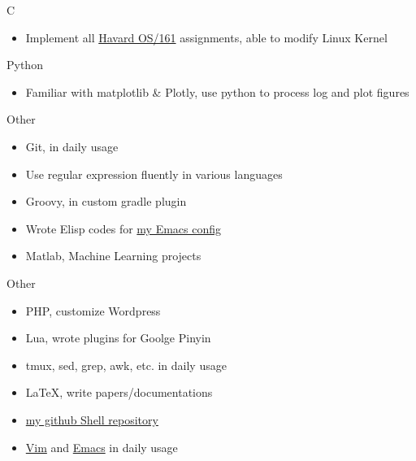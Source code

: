 \cvcomputer
{C}{
\begin{itemize}
  \item Implement all \href{http://www.eecs.harvard.edu/~syrah/os161/}{Havard OS/161} assignments,
  able to modify Linux Kernel
\end{itemize}
}
{Python}{
\begin{itemize}
  \item Familiar with matplotlib \& Plotly, use python to process log and plot figures
\end{itemize}
}

\cvcomputer
{Other}{
\begin{itemize}
  \item Git, in daily usage
  \item Use regular expression fluently in various languages
  \item Groovy, in custom gradle plugin
  \item Wrote Elisp codes for \href{https://github.com/xcv58/Emacs_config}{my Emacs config}
  \item Matlab, Machine Learning projects
\end{itemize}
}
{Other}{
\begin{itemize}
  \item PHP, customize Wordpress
  \item Lua, wrote plugins for Goolge Pinyin
  \item tmux, sed, grep, awk, etc. in daily usage
  \item {\LaTeX}, write papers/documentations
  \item \href{https://github.com/xcv58/Shell_script}{my github Shell repository}
  \item \href{https://github.com/xcv58/Vim_config}{Vim} and \href{https://github.com/xcv58/Emacs_config}{Emacs} in daily usage\\
\end{itemize}
}
